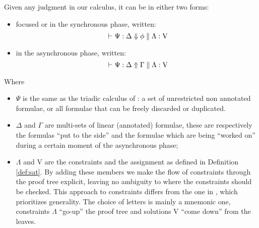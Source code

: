 \begin{define}
	Given any judgment in our calculus, it can be in either two forms:
	\begin{itemize}
		\item focused or in the synchronous phase, written:
			$$\; \vdash_{\text{}} \Psi : \Delta \Downarrow \phi \; \Vert \; \Lambda : \mathrm{V}$$
		\item in the asynchronous phase, written:
			$$\; \vdash_{\text{}} \Psi : \Delta \Uparrow \Gamma \; \Vert \; \Lambda : \mathrm{V}$$
	\end{itemize}
	Where 
	\begin{itemize}
		\item $\Psi$ is the same as the triadic calculus of \cite{Focusing}: a set of unrestricted non annotated formulae, or all formulae that can be freely discarded or duplicated.
		\item $\Delta$ and $\Gamma$ are multi-sets of linear (annotated) formulae, these are respectively the formulas ``put to the side'' and the formulae which are being ``worked on'' during a certain moment of the asynchronous phase;
		\item $\Lambda$ and V are the constraints and the assignment as defined in Definition \ref{def:sat}.
			By adding these members we make the flow of constraints through the proof tree explicit, leaving no ambiguity to where the constraints should be checked.
			This approach to constraints differs from the one in \cite{HarlandPym}, which prioritizes generality.
			The choice of letters is mainly a mnemonic one, constraints $\Lambda$ ``go-up'' the proof tree and solutions V ``come down'' from the leaves.
	\end{itemize}
\end{define}

